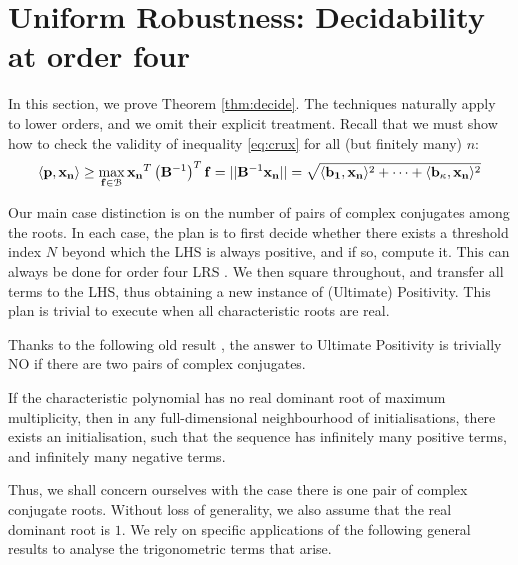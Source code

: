 \section{Uniform Robustness: Decidability at order four}
\label{section:decidability}
In this section, we prove Theorem \ref{thm:decide}. The techniques naturally apply to lower orders, and we omit their explicit treatment. Recall that we must show how to check the validity of inequality \ref{eq:crux} for all (but finitely many) $n$:
$$
\langle\mathbf{p}, \mathbf{x_n}\rangle \ge \max_{\mathbf{f} \in \mathcal{B}}\mathbf{x_n}^T\left(\mathbf{B}^{-1}\right)^T\mathbf{f} = ||\mathbf{B}^{-1}\mathbf{x_n}|| = \sqrt{\langle\mathbf{b_1}, \mathbf{x_n}\rangle^2 +\dots+\langle\mathbf{b_\kappa}, \mathbf{x_n}\rangle^2}
$$

Our main case distinction is on the number of pairs of complex conjugates among the roots. In each case, the plan is to first decide whether there exists a threshold index $N$ beyond which the LHS is always positive, and if so, compute it. This can always be done for order four LRS \cite{joeljames3}. We then square throughout, and transfer all terms to the LHS, thus obtaining a new instance of (Ultimate) Positivity. This plan is trivial to execute when all characteristic roots are real.

Thanks to the following old result \cite[Thm. 2]{positive-dominant}, the answer to Ultimate Positivity is trivially NO if there are two pairs of complex conjugates.

\begin{proposition}
\label{prop:folklore}
If the characteristic polynomial has no real dominant root of maximum multiplicity, then in any full-dimensional neighbourhood of initialisations, there exists an initialisation, such that the sequence has infinitely many positive terms, and infinitely many negative terms.
\end{proposition}

Thus, we shall concern ourselves with the case there is one pair of complex conjugate roots. Without loss of generality, we also assume that the real dominant root is $1$. We rely on specific applications of the following general results to analyse the trigonometric terms that arise.

